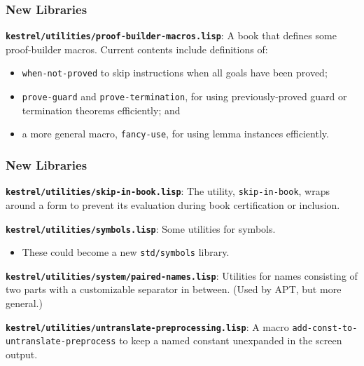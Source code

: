 \documentclass{beamer}
\newcommand{\code}[1]{\texttt{#1}}
\newcommand{\bookpath}[1]{\textbf{\code{#1}}}
\newcommand{\newlibtitle}{\frametitle{New Libraries}}
\newcommand{\separation}{\vspace*{1ex}}
\begin{document}

\begin{frame}

\newlibtitle

\bookpath{kestrel/utilities/proof-builder-macros.lisp}:
A book that defines some proof-builder macros.  Current contents
include definitions of:
\begin{itemize}
\item
\code{when-not-proved} to skip instructions when all goals have
been proved;
\item
\code{prove-guard} and \code{prove-termination}, for using
previously-proved guard or termination theorems efficiently; and
\item
a more general macro, \code{fancy-use}, for using lemma
instances efficiently.
\end{itemize}

\end{frame}


\begin{frame}

\newlibtitle

\bookpath{kestrel/utilities/skip-in-book.lisp}:
The utility, \code{skip-in-book}, wraps around a form to prevent its
evaluation during book certification or inclusion.

\separation

\bookpath{kestrel/utilities/symbols.lisp}:
Some utilities for symbols.
\begin{itemize}
\item
These could become a new \code{std/symbols} library.
\end{itemize}

\separation

\bookpath{kestrel/utilities/system/paired-names.lisp}:
Utilities for names consisting of
two parts with a customizable separator in between.
(Used by APT, but more general.)

\separation

\bookpath{kestrel/utilities/untranslate-preprocessing.lisp}:
A macro \code{add-const-to-untranslate-preprocess}
to keep a named constant unexpanded in the screen output.

\end{frame}

\end{document}
